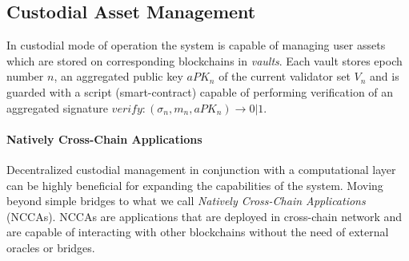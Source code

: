 \documentclass{article}
\begin{document}
    \subsection{Custodial Asset Management}\label{subsec:custodial-asset-management}
    In custodial mode of operation the system is capable of managing user assets which are stored on corresponding blockchains in \emph{vaults}.
    Each vault stores epoch number $n$, an aggregated public key $aPK_n$ of the current validator set $V_n$ and
    is guarded with a script (smart-contract) capable of performing verification of
    an aggregated signature $verify: (\sigma_n, m_n, aPK_n) \rightarrow 0 | 1$.

    \paragraph{Natively Cross-Chain Applications}
    Decentralized custodial management in conjunction with a computational layer can be highly beneficial for expanding the capabilities of the system.
    Moving beyond simple bridges to what we call \emph{Natively Cross-Chain Applications} (NCCAs).
    NCCAs are applications that are deployed in cross-chain network and are capable of interacting with other blockchains without the need of external oracles or bridges.

    \newpage

    \printbibliography
\end{document}
